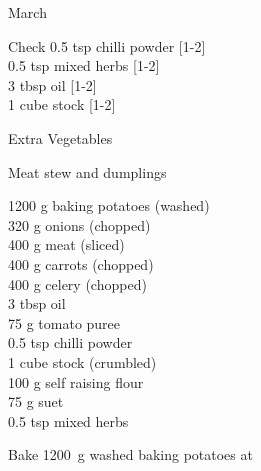 \begin{menu}{March}
      \par\vfil %
      \vfil\clearpage %
      \begin{shoppinglist}{Check}
      0.5 tsp chilli powder 
        {\scriptsize[1-2]}\\
      0.5 tsp mixed herbs 
        {\scriptsize[1-2]}\\
      3 tbsp oil 
        {\scriptsize[1-2]}\\
      1 cube stock 
        {\scriptsize[1-2]}\\
      \end{shoppinglist}%
      \begin{shoppinglist}{Extra Vegetables}
      \end{shoppinglist}%
      \par\vfil %
    \vfil\clearpage
  
    \begin{recipe}{2}{Meat stew and dumplings}%
    
		\begin{ingredients}
		1200 g baking potatoes (washed) \\
	320 g onions (chopped) \\
	400 g meat (sliced) \\
	400 g carrots (chopped) \\
	400 g celery (chopped) \\
	3 tbsp oil  \\
	75 g tomato puree  \\
	0.5 tsp chilli powder  \\
	1 cube stock (crumbled) \\
	100 g self raising flour  \\
	75 g suet  \\
	0.5 tsp mixed herbs  \\
	
		\end{ingredients}
	
	
	
    \begin{instructions}
    \item 
      Bake 1200~g washed baking potatoes
      at
      

\end{instructions}
\end{recipe}
\end{menu}

